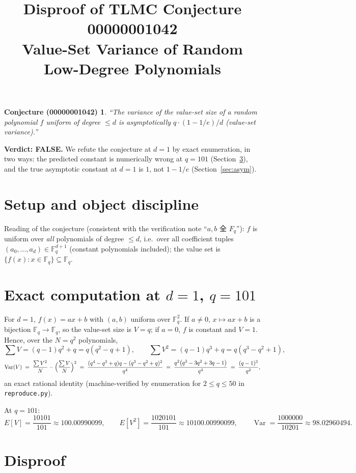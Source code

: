 \documentclass[11pt]{article}
\title{Disproof of TLMC Conjecture 00000001042\\
\large Value-Set Variance of Random Low-Degree Polynomials}
\author{}
\date{}
\newtheorem*{claim*}{Conjecture (00000001042)}
\begin{document}
\maketitle

\begin{claim*}
\emph{``The variance of the value-set size of a random polynomial $f$ uniform of degree $\le d$ is asymptotically $q\cdot(1 - 1/e)/d$ (value-set variance).''}
\end{claim*}

\noindent\textbf{Verdict: FALSE.} We refute the conjecture at $d=1$ by exact enumeration, in two ways: the predicted constant is numerically wrong at $q=101$ (Section~\ref{sec:disproof}), and the true asymptotic constant at $d=1$ is $1$, not $1-1/e$ (Section~\ref{sec:asym}).

\section{Setup and object discipline}

Reading of the conjecture (consistent with the verification note ``$a,b$ 全 $F_q$''): $f$ is uniform over \emph{all} polynomials of degree $\le d$, i.e.\ over all coefficient tuples $(a_0,\dots,a_d)\in \mathbb{F}_q^{d+1}$ (constant polynomials included); the value set is $\{f(x): x\in\mathbb{F}_q\}\subseteq\mathbb{F}_q$.

\section{Exact computation at $d=1$, $q=101$}

For $d=1$, $f(x)=ax+b$ with $(a,b)$ uniform over $\mathbb{F}_q^2$. If $a\neq 0$, $x\mapsto ax+b$ is a bijection $\mathbb{F}_q\to\mathbb{F}_q$, so the value-set size is $V=q$; if $a=0$, $f$ is constant and $V=1$. Hence, over the $N=q^2$ polynomials,
\[
\sum V=(q-1)q^2+q=q(q^2-q+1),\qquad
\sum V^2=(q-1)q^3+q=q(q^3-q^2+1),
\]
\[
\operatorname{Var}(V)\;=\;\frac{\sum V^2}{N}-\Bigl(\frac{\sum V}{N}\Bigr)^{2}
\;=\;\frac{(q^4-q^3+q)q-(q^3-q^2+q)^2}{q^4}
\;=\;\frac{q^2\bigl(q^3-3q^2+3q-1\bigr)}{q^4}
\;=\;\frac{(q-1)^3}{q^2},
\]
an exact rational identity (machine-verified by enumeration for $2\le q\le 50$ in \texttt{reproduce.py}).

At $q=101$:
\[
E[V]=\frac{10101}{101}\approx 100.00990099,\qquad
E[V^2]=\frac{1020101}{101}\approx 10100.00990099,\qquad
\operatorname{Var}=\frac{1000000}{10201}\approx 98.02960494.
\]

\section{Disproof}\label{sec:disproof}
\end{document}

